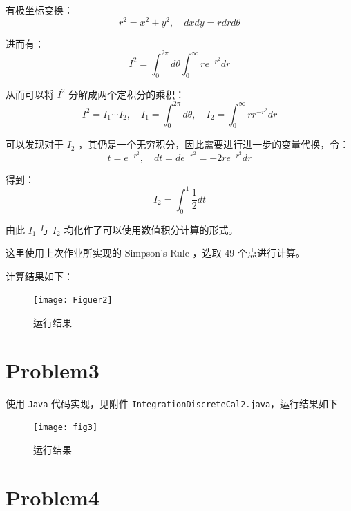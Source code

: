 \documentclass[UTF8]{ctexart}
\begin{document}
    有极坐标变换：
    \begin{equation*}
        r^2 = x^2 + y^2, \quad dx dy = r dr d \theta
    \end{equation*}

    进而有：
    \begin{equation*}
        I^2 = \int_{0}^{2 \pi} d \theta \int_{0}^{\infty} r e^{-r^2} dr
    \end{equation*}

    从而可以将 \(I^2\) 分解成两个定积分的乘积：
    \begin{equation*}
        I^2 = I_1 \cdots I_2, \quad I_1 = \int_{0}^{2 \pi} d \theta, \quad I_2 = \int_{0}^{\infty} r r^{-r^2} dr
    \end{equation*}

    可以发现对于 \(I_2\) ，其仍是一个无穷积分，因此需要进行进一步的变量代换，令：
    \begin{equation*}
        t = e^{-r^2}, \quad dt = de^{-r^2} = -2 r e^{-r^2} dr
    \end{equation*}

    得到：
    \begin{equation*}
        I_2 = \int_{0}^{1} \frac{1}{2} dt
    \end{equation*}

    由此 \(I_1\) 与 \(I_2\) 均化作了可以使用数值积分计算的形式。

    这里使用上次作业所实现的 Simpson’s Rule ，选取 49 个点进行计算。

    计算结果如下：
    \begin{figure}[h]
        \centering
        \texttt{[image: Figuer2]}
        \caption{运行结果}\label{fig:figure2}
    \end{figure}

    \section{Problem3}\label{sec:section3}

    使用 \texttt{Java} 代码实现，见附件 \texttt{IntegrationDiscreteCal2.java}，运行结果如下
    \begin{figure}[h]
        \centering
        \texttt{[image: fig3]}
        \caption{运行结果}\label{fig:figure3}
    \end{figure}

    \newpage
    \section{Problem4}\label{sec:section4}
\end{document}
